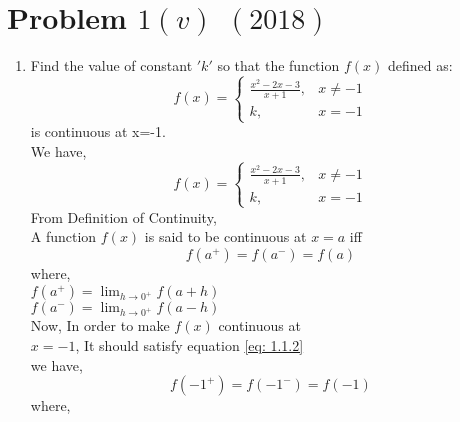 \documentclass[journal,12pt,twocolumn]{IEEEtran}
\renewcommand\thesection{\arabic{section}}
\begin{document}
\bigskip
\renewcommand{\thefigure}{\theenumi}
\renewcommand{\thetable}{\theenumi}
\renewcommand{\theequation}{\theenumi}
\section{Problem $1(v)$ $ (2018)$}
\begin{enumerate}[label=\thesection.\arabic*.,ref=\thesection.\theenumi]
    \item Find the value of constant $'k'$ so that the function $f(x)$ defined as:
        \begin{equation*}
            f(x)=\begin{cases}
                \frac{x^2-2x-3}{x+1}, & x\neq -1 \\
                k, & x=-1
            \end{cases}
        \end{equation*}
        is continuous at x=-1.\\
        \solution We have,\\
        \begin{equation}
            f(x)=\begin{cases}
                \frac{x^2-2x-3}{x+1}, & x\neq -1 \\
                k, & x=-1
            \end{cases} \label{eq: 1.1.1}
        \end{equation}
        From Definition of Continuity,\\
        A function $f(x)$ is said to be continuous at $x=a$ iff \\
        \begin{equation}
            f(a^+)=f(a^-)=f(a) \label{eq: 1.1.2}
        \end{equation}
        where,\\
        $f(a^+)=\lim_{h\to 0^+} f(a+h)$\\
        $f(a^-)=\lim_{h\to 0^+} f(a-h)$\\
        Now, In order to make $f(x)$ continuous at \\$x=-1$, It should satisfy equation \eqref{eq: 1.1.2}\\
        we have,
        \begin{equation}
            f(-1^+)=f(-1^-)=f(-1) \label{eq: 1.1.3}
        \end{equation}
        where,
        

\end{enumerate}
\end{document}
